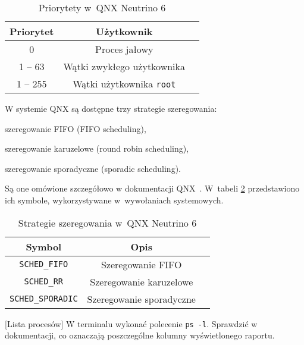 \begin{table}[h!]
  \centering
  \caption{Priorytety w~QNX Neutrino 6}
  \label{tab:2N6W7}
  \begin{tabular}{|c|c|c|}
    \hline
    \textbf{Priorytet} & \textbf{Użytkownik} \\ \hline
    0 & Proces jałowy \\ \hline
    1 -- 63 & Wątki zwykłego użytkownika \\ \hline
    1 -- 255 & Wątki użytkownika \texttt{root} \\ \hline
  \end{tabular}
\end{table}

W systemie QNX są dostępne trzy strategie szeregowania:
\begin{myitemize}
  \item szeregowanie FIFO (FIFO scheduling),
  \item szeregowanie karuzelowe (round robin scheduling),
  \item szeregowanie sporadyczne (sporadic scheduling).
\end{myitemize}
Są one omówione szczegółowo w dokumentacji QNX~\cite{qnx}. W tabeli
\ref{tab:A9C2X} przedstawiono ich symbole, wykorzystywane w~wywołaniach
systemowych.


\begin{table}[h!]
  \centering
  \caption{Strategie szeregowania w~QNX Neutrino 6}
  \label{tab:A9C2X}
  \begin{tabular}{|c|c|c|}
    \hline
    \textbf{Symbol}           & \textbf{Opis} \\ \hline
    \texttt{SCHED\_FIFO}      & Szeregowanie FIFO \\ \hline
    \texttt{SCHED\_RR}        & Szeregowanie karuzelowe \\ \hline
    \texttt{SCHED\_SPORADIC}  & Szeregowanie sporadyczne \\ \hline
  \end{tabular}
\end{table}

\begin{example}{[Lista procesów]}
  \label{ex:TYRDA}
  W terminalu wykonać polecenie \texttt{ps -l}. Sprawdzić w {\color{red}dokumentacji},
  co oznaczają poszczególne kolumny wyświetlonego raportu.
\end{example}

